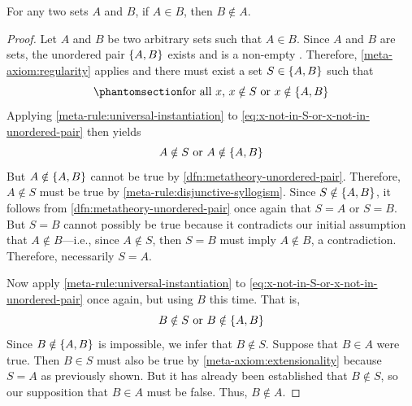 \begin{thm}
     \label{thm:metatheory-asymmetry-of-membership-relation}
    For any two sets \( A \) and \( B \), if \( A \in B \), then \( B \notin A \).
\end{thm}

\begin{proof}
    Let \( A \) and \( B \) be two arbitrary sets such that \( A \in B \).
    Since \( A \) and \( B \) are sets, the unordered pair \( \mleft\{ A, B \mright\} \) exists and is a non-empty
    .
    Therefore, \cref{meta-axiom:regularity} applies and there must exist a set \( S \in \mleft\{ A, B \mright\} \) such that
    \begin{equation}
        \phantomsection \label{eq:x-not-in-S-or-x-not-in-unordered-pair}
        \text{for all \( x \), \( x \notin S \) or \( x \notin \mleft\{ A, B \mright\} \)}
    \end{equation}
    Applying \cref{meta-rule:universal-instantiation} to \eqref{eq:x-not-in-S-or-x-not-in-unordered-pair} then yields
    \begin{equation*}
        A \notin S \ \text{or} \ A \notin \mleft\{ A, B \mright\}
    \end{equation*}
    But \( A \notin \mleft\{ A, B \mright\} \) cannot be true by \cref{dfn:metatheory-unordered-pair}.
    Therefore, \( A \notin S \) must be true by \cref{meta-rule:disjunctive-syllogism}.
    Since \( S \notin \mleft\{ A, B \mright\} \), it follows from \cref{dfn:metatheory-unordered-pair} once again that
    \( S = A \) or \( S = B \).
    But \( S = B \) cannot possibly be true because it contradicts our initial assumption that \( A \notin B \)---i.e., since
    \( A \notin S \), then \( S = B \) must imply \( A \notin B \), a contradiction.
    Therefore, necessarily \( S = A \).

    \vspace{0.3cm}
    \noindent
    Now apply \cref{meta-rule:universal-instantiation} to \eqref{eq:x-not-in-S-or-x-not-in-unordered-pair} once again, but using \( B \) this time.
    That is,
    \begin{equation*}
        B \notin S \ \text{or} \ B \notin \mleft\{ A, B \mright\}
    \end{equation*}
    Since \( B \notin \mleft\{ A, B \mright\} \) is impossible, we infer that \( B \notin S \).
    Suppose that \( B \in A \) were true. Then \( B \in S \) must also be true by \cref{meta-axiom:extensionality} because \( S = A \) as previously shown.
    But it has already been established that \( B \notin S \), so our supposition that \( B \in A \) must be false.
    Thus, \( B \notin A \).
\end{proof}

